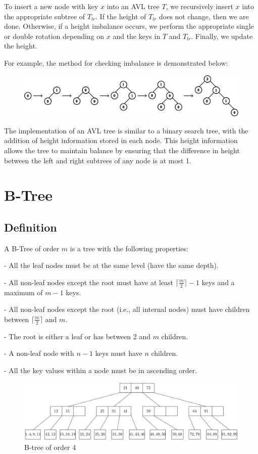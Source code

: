 To insert a new node with key \(x\) into an AVL tree \(T\), we recursively insert \(x\) into the appropriate subtree of \(T_{lr}\). If the height of \(T_{lr}\) does not change, then we are done. Otherwise, if a height imbalance occurs, we perform the appropriate single or double rotation depending on \(x\) and the keys in \(T\) and \(T_{lr}\). Finally, we update the height.

For example, the method for checking imbalance is demonstrated below:
\begin{figure}[H]
  \centering
  \includegraphics[width=\textwidth]{Figure/AVLInDemo.pdf}
\end{figure}

The implementation of an AVL tree is similar to a binary search tree, with the addition of height information stored in each node. This height information allows the tree to maintain balance by ensuring that the difference in height between the left and right subtrees of any node is at most 1.

\section{B-Tree}
\subsection{Definition}
A B-Tree of order \(m\) is a tree with the following properties:  

- All the leaf nodes must be at the same level (have the same depth).  

- All non-leaf nodes except the root must have at least \(\lceil \frac{m}{2} \rceil - 1\) keys and a maximum of \(m - 1\) keys.  

- All non-leaf nodes except the root (i.e., all internal nodes) must have children between \(\lceil \frac{m}{2} \rceil\) and \(m\).  

- The root is either a leaf or has between 2 and \(m\) children.  

- A non-leaf node with \(n-1\) keys must have \(n\) children.  

- All the key values within a node must be in ascending order.  


\begin{figure}[H]
  \centering
  \includegraphics[width=\textwidth]{Figure/B-Tree.pdf}
  \caption*{B-tree of order 4}
\end{figure}

